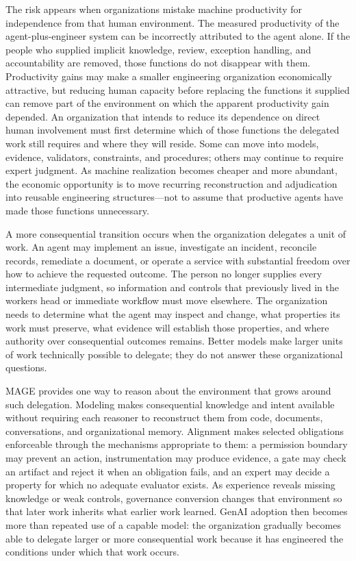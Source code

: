 The risk appears when organizations mistake machine productivity for independence from that human environment. The measured productivity of the agent-plus-engineer system can be incorrectly attributed to the agent alone. If the people who supplied implicit knowledge, review, exception handling, and accountability are removed, those functions do not disappear with them. Productivity gains may make a smaller engineering organization economically attractive, but reducing human capacity before replacing the functions it supplied can remove part of the environment on which the apparent productivity gain depended. An organization that intends to reduce its dependence on direct human involvement must first determine which of those functions the delegated work still requires and where they will reside. Some can move into models, evidence, validators, constraints, and procedures; others may continue to require expert judgment. As machine realization becomes cheaper and more abundant, the economic opportunity is to move recurring reconstruction and adjudication into reusable engineering structures---not to assume that productive agents have made those functions unnecessary.

A more consequential transition occurs when the organization delegates a unit of work. An agent may implement an issue, investigate an incident, reconcile records, remediate a document, or operate a service with substantial freedom over how to achieve the requested outcome. The person no longer supplies every intermediate judgment, so information and controls that previously lived in the worker\textquotesingle s head or immediate workflow must move elsewhere. The organization needs to determine what the agent may inspect and change, what properties its work must preserve, what evidence will establish those properties, and where authority over consequential outcomes remains. Better models make larger units of work technically possible to delegate; they do not answer these organizational questions.

MAGE provides one way to reason about the environment that grows around such delegation. Modeling makes consequential knowledge and intent available without requiring each reasoner to reconstruct them from code, documents, conversations, and organizational memory. Alignment makes selected obligations enforceable through the mechanisms appropriate to them: a permission boundary may prevent an action, instrumentation may produce evidence, a gate may check an artifact and reject it when an obligation fails, and an expert may decide a property for which no adequate evaluator exists. As experience reveals missing knowledge or weak controls, governance conversion changes that environment so that later work inherits what earlier work learned. GenAI adoption then becomes more than repeated use of a capable model: the organization gradually becomes able to delegate larger or more consequential work because it has engineered the conditions under which that work occurs.
